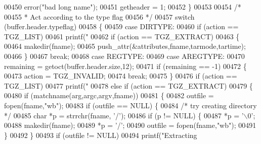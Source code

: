 \begin{DoxyCode}
{{{{00450                   error(\textcolor{stringliteral}{"bad long name"});
00451               getheader = 1;
00452             \}
00453 
00454           \textcolor{comment}{/*}
00455 \textcolor{comment}{           * Act according to the type flag}
00456 \textcolor{comment}{           */}
00457           \textcolor{keywordflow}{switch} (buffer.header.typeflag)
00458             \{
00459             \textcolor{keywordflow}{case} DIRTYPE:
00460               \textcolor{keywordflow}{if} (action == TGZ\_LIST)
00461                 printf(\textcolor{stringliteral}{" %
00462               \textcolor{keywordflow}{if} (action == TGZ\_EXTRACT)
00463                 \{
00464                   makedir(fname);
00465                   push\_attr(&attributes,fname,tarmode,tartime);
00466                 \}
00467               \textcolor{keywordflow}{break};
00468             \textcolor{keywordflow}{case} REGTYPE:
00469             \textcolor{keywordflow}{case} AREGTYPE:
00470               remaining = getoct(buffer.header.size,12);
00471               \textcolor{keywordflow}{if} (remaining == -1)
00472                 \{
00473                   action = TGZ\_INVALID;
00474                   \textcolor{keywordflow}{break};
00475                 \}
00476               \textcolor{keywordflow}{if} (action == TGZ\_LIST)
00477                 printf(\textcolor{stringliteral}{" %
00478               \textcolor{keywordflow}{else} \textcolor{keywordflow}{if} (action == TGZ\_EXTRACT)
00479                 \{
00480                   \textcolor{keywordflow}{if} (matchname(arg,argc,argv,fname))
00481                     \{
00482                       outfile = fopen(fname,\textcolor{stringliteral}{"wb"});
00483                       \textcolor{keywordflow}{if} (outfile == NULL) \{
00484                         \textcolor{comment}{/* try creating directory */}
00485                         \textcolor{keywordtype}{char} *p = strrchr(fname, \textcolor{charliteral}{'/'});
00486                         \textcolor{keywordflow}{if} (p != NULL) \{
00487                           *p = \textcolor{charliteral}{'\(\backslash\)0'};
00488                           makedir(fname);
00489                           *p = \textcolor{charliteral}{'/'};
00490                           outfile = fopen(fname,\textcolor{stringliteral}{"wb"});
00491                         \}
00492                       \}
00493                       \textcolor{keywordflow}{if} (outfile != NULL)
00494                         printf(\textcolor{stringliteral}{"Extracting %
}}}}}}}
\end{DoxyCode}
